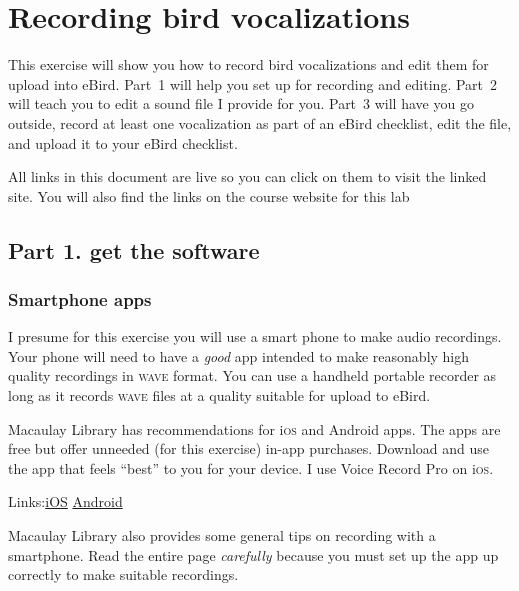 \documentclass[12pt]{article}
\newcommand{\ios}{i\textsc{os}}
\begin{document}
\thispagestyle{plain}

\section*{Recording bird vocalizations}

This exercise will show you how to record bird vocalizations and edit them for upload into eBird.  Part~1 will help you set up for recording and editing. Part~2 will teach you to edit a sound file I provide for you. Part~3 will have you go outside, record at least one vocalization as part of an eBird checklist, edit the file, and upload it to your eBird checklist.

All links in this document are live so you can click on them to visit the linked site. You will also find the links on the course website for this lab


\subsection*{Part 1. get the software}

\subsubsection*{Smartphone apps}

I presume for this exercise you will use a smart phone to make audio recordings. Your phone will need to have a \emph{good} app intended to make reasonably high quality recordings in \textsc{wave} format. You can use a handheld portable recorder as long as it records \textsc{wave} files at a quality suitable for upload to eBird.

Macaulay Library has recommendations for \ios{} and Android apps. The apps are free but offer unneeded (for this exercise) in-app purchases. Download and use the app that feels “best” to you for your device. I use Voice Record Pro on \ios. 

Links:\quad \href{https://www.macaulaylibrary.org/resources/setting-up-recording-apps/setting-up-recording-apps-for-ios-devices/}{iOS}
\qquad
\href{https://www.macaulaylibrary.org/resources/setting-up-recording-apps/setting-up-recording-apps-for-android-devices/}{Android}

Macaulay Library also provides some general tips on recording with a smartphone. Read the entire page \emph{carefully} because you must set up the app up correctly to make suitable recordings.
\end{document}
